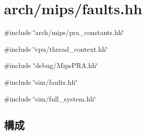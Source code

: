 \hypertarget{arch_2mips_2faults_8hh}{
\section{arch/mips/faults.hh}
\label{arch_2mips_2faults_8hh}
}
{\ttfamily \#include \char`\"{}arch/mips/pra\_\-constants.hh\char`\"{}}\par
{\ttfamily \#include \char`\"{}cpu/thread\_\-context.hh\char`\"{}}\par
{\ttfamily \#include \char`\"{}debug/MipsPRA.hh\char`\"{}}\par
{\ttfamily \#include \char`\"{}sim/faults.hh\char`\"{}}\par
{\ttfamily \#include \char`\"{}sim/full\_\-system.hh\char`\"{}}\par
\subsection*{構成}
